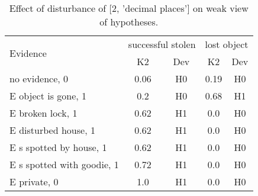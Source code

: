 \begin{table}\begin{tabular}{l|cc|cc}\toprule\multirow{2}{*}{Evidence} & \multicolumn{2}{c}{successful stolen}& \multicolumn{2}{c}{lost object}\\& {K2} & {Dev}& {K2} & {Dev}\\\midrule
no evidence, 0 & \cellcolor{Bittersweet}0.06&\cellcolor{Bittersweet}H0&\cellcolor{Bittersweet}0.19&\cellcolor{Bittersweet}H0\\E object is gone, 1 & \cellcolor{Bittersweet}0.2&\cellcolor{Bittersweet}H0&\cellcolor{Bittersweet}0.68&\cellcolor{Bittersweet}H1\\E broken lock, 1 & \cellcolor{Bittersweet}0.62&\cellcolor{Bittersweet}H1&\cellcolor{Bittersweet}0.0&\cellcolor{Bittersweet}H0\\E disturbed house, 1 & \cellcolor{Bittersweet}0.62&\cellcolor{Bittersweet}H1&\cellcolor{Bittersweet}0.0&\cellcolor{Bittersweet}H0\\E s spotted by house, 1 & \cellcolor{Bittersweet}0.62&\cellcolor{Bittersweet}H1&\cellcolor{Bittersweet}0.0&\cellcolor{Bittersweet}H0\\E s spotted with goodie, 1 & \cellcolor{Bittersweet}0.72&\cellcolor{Bittersweet}H1&\cellcolor{Bittersweet}0.0&\cellcolor{Bittersweet}H0\\E private, 0 & \cellcolor{Bittersweet}1.0&\cellcolor{Bittersweet}H1&\cellcolor{Bittersweet}0.0&\cellcolor{Bittersweet}H0\\\bottomrule\end{tabular}\caption{Effect of disturbance of [2, 'decimal places'] on weak view of hypotheses.}\end{table}